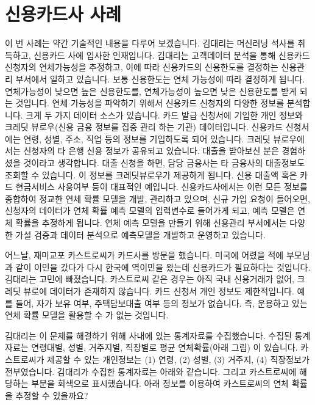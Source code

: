 \documentclass[letterpaper,10pt,english]{jupyterBook}
\begin{document}
\part{신용카드사 사례}
\label{\detokenize{chapter3/3.1.2_Use_Case:id1}}\label{\detokenize{chapter3/3.1.2_Use_Case::doc}}
\sphinxAtStartPar
이 번 사례는 약간 기술적인 내용을 다루어 보겠습니다. 김대리는 머신러닝 석사를 취득하고, 신용카드 사에 입사한 인재입니다. 김대리는 고객데이터 분석을 통해 신용카드 신청자의 연체가능성을 추정하고, 이에 따라 신용카드의 신용한도를 결정하는 신용관리 부서에서 일하고 있습니다. 보통 신용한도는 연체 가능성에 따라 결정하게 됩니다. 연체가능성이 낮으면 높은 신용한도를, 연체가능성이 높으면 낮은 신용한도를 받게 되는 것입니다. 연체 가능성을 파악하기 위해서 신용카드 신청자의 다양한 정보를 분석합니다. 크게 두 가지 데이터 소스가 있습니다. 카드 발급 신청서에 기입한 개인 정보와 크레딧 뷰로우(신용 금융 정보를 집중 관리 하는 기관) 데이터입니다. 신용카드 신청서에는 연령, 성별, 주소, 직업 등의 정보를 기입하도록 되어 있습니다. 크레딧 뷰로우에서는 신청자의 타 은행 신용 정보가 공유되고 있습니다. 대출을 받아보신 분은 경험하셨을 것이라고 생각합니다. 대출 신청을 하면, 담당 금융사는 타 금융사의 대출정보도 조회할 수 있습니다. 이 정보를 크레딧뷰로우가 제공하게 됩니다. 신용 대출액 혹은 카드 현금서비스 사용여부 등이 대표적인 예입니다. 신용카드사에서는 이런 모든 정보를 종합하여 정교한 연체 확률 모델을 개발, 관리하고 있으며, 신규 가입 요청이 들어오면, 신청자의 데이터가 연체 확률 예측 모델의 입력변수로 들어가게 되고, 예측 모델은 연체 확률을 추정하게 됩니다. 연체 예측 모델을 만들기 위해 신용관리 부서에서는 다양한 가설 검증과 데이터 분석으로 예측모델을 개발하고 운영하고 있습니다.

\sphinxAtStartPar
어느날, 재미교포 카스트로씨가 카드사를 방문을 했습니다. 미국에 어렸을 적에 부모님과 같이 이민을 갔다가 다시 한국에 역이민을 왔는데 신용카드가 필요하다는 것입니다. 김대리는 고민에 빠졌습니다. 카스트로씨 같은 경우는 아직 국내 신용거래가 없어, 크레딧 뷰로에 데이터가 존재하지 않습니다. 카드 신청서 개인 정보도 제한적입니다. 예를 들어, 자가 보유 여부, 주택담보대출 여부 등의 정보가 없습니다. 즉, 운용하고 있는 연체 확률 모델을 활용할 수 가 없는 것입니다.

\sphinxAtStartPar
김대리는 이 문제를 해결하기 위해 사내에 있는 통계자료를 수집했습니다. 수집된 통계자료는 연령대별, 성별, 거주지별, 직장별로 평균 연체확률(아래 그림) 이 있습니다. 카스트로씨가 제공할 수 있는 개인정보는 (1) 연령, (2) 성별, (3) 거주지, (4) 직장정보가 전부였습니다. 김대리가 수집한 통계자료는 아래와 같습니다. 그리고 카스트로씨에 해당하는 부분을 회색으로 표시했습니다. 아래 정보를 이용하여 카스트로씨의 연체 확률을 추정할 수 있을까요?
\end{document}
